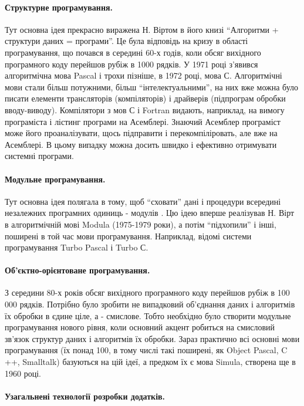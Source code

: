 \documentclass[a4paper,14pt, titlepage]{article}
\begin{document}
\paragraph{Структурне програмування.}
Тут основна ідея прекрасно виражена Н. Віртом в його книзі ``Алгоритми +
структури даних = програми''. Це була відповідь на кризу в області
програмування, що почався в середині 60-х годів, коли обсяг вихідного
програмного коду перейшов рубіж в 1000 рядків. У 1971 році з'явився
алгоритмічна мова Pascal і трохи пізніше, в 1972 році, мова С.
Алгоритмічні мови стали більш потужними, більш ``інтелектуальними'', на
них вже можна було писати елементи трансляторів (компіляторів) і
драйверів (підпрограм обробки вводу-виводу). Компілятори з мов С і
Fortran видають, наприклад, на вимогу програміста і лістинг програми на
Асемблері. Знаючий Асемблер програміст може його проаналізувати, щось
підправити і перекомпіліровать, але вже на Асемблері. В цьому випадку
можна досить швидко і ефективно отримувати системні програми.

\paragraph{Модульне програмування.}

Тут основна ідея полягала в тому, щоб ``сховати'' дані і процедури
всередині незалежних програмних одиниць - модулів . Цю ідею вперше
реалізував Н. Вірт в алгоритмічній мові Modula (1975-1979 роки), а потім
``підхопили'' і інші, поширені в той час мови програмування. Наприклад,
відомі системи програмування Turbo Pascal і Turbo С.

\paragraph{Об'єктно-орієнтоване програмування.}

З середини 80-х років обсяг вихідного програмного коду перейшов рубіж в
100 000 рядків. Потрібно було зробити не випадковий об'єднання даних і
алгоритмів їх обробки в єдине ціле, а - смислове. Тобто необхідно було
створити модульне програмування нового рівня, коли основний акцент
робиться на смисловий зв'язок структур даних і алгоритмів їх обробки.
Зараз практично всі основні мови програмування (їх понад 100, в тому
числі такі поширені, як Object Pascal, C ++, Smalltalk) базуються на цій
ідеї, а предком їх є мова Simula, створена ще в 1960 році.

\paragraph{Узагальнені технології розробки додатків.}
\end{document}
